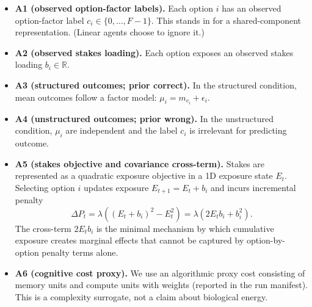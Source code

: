 \documentclass[11pt]{article}
\begin{document}
\begin{itemize}[leftmargin=*]
  \item \textbf{A1 (observed option-factor labels).} Each option $i$ has an observed option-factor label $c_i\in\{0,\dots,F-1\}$. This stands in for a shared-component representation. (Linear agents choose to ignore it.)
  \item \textbf{A2 (observed stakes loading).} Each option exposes an observed stakes loading $b_i\in\mathbb{R}$.
  \item \textbf{A3 (structured outcomes; prior correct).} In the structured condition, mean outcomes follow a factor model: $\mu_i = m_{c_i} + \epsilon_i$.
  \item \textbf{A4 (unstructured outcomes; prior wrong).} In the unstructured condition, $\mu_i$ are independent and the label $c_i$ is irrelevant for predicting outcome.
  \item \textbf{A5 (stakes objective and covariance cross-term).} Stakes are represented as a quadratic exposure objective in a 1D exposure state $E_t$. Selecting option $i$ updates exposure $E_{t+1}=E_t+b_i$ and incurs incremental penalty
  \[
  \Delta P_t = \lambda\left((E_t+b_i)^2 - E_t^2\right)=\lambda(2E_tb_i+b_i^2).
  \]
  The cross-term $2E_tb_i$ is the minimal mechanism by which cumulative exposure creates marginal effects that cannot be captured by option-by-option penalty terms alone.
  \item \textbf{A6 (cognitive cost proxy).} We use an algorithmic proxy cost consisting of memory units and compute units with weights (reported in the run manifest). This is a complexity surrogate, not a claim about biological energy.
\end{itemize}
\end{document}
